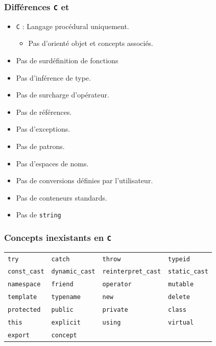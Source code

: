 \begin{frame}
\frametitle{Différences \texttt{C} et \cpp}
\begin{itemize}[<+->]
\item \texttt{C} : Langage procédural uniquement.
	\begin{itemize}
	\item Pas d'orienté objet et concepts associés.
	\end{itemize}
\item Pas de surdéfinition de fonctions
\item Pas d'inférence de type.
\item Pas de surcharge d'opérateur.
\item Pas de références.
\item Pas d'exceptions.
\item Pas de patrons.
\item Pas d'espaces de noms.
\item Pas de conversions définies par l'utilisateur.
\item Pas de conteneurs standards.
\item Pas de \texttt{string}
\end{itemize}
\end{frame}

\begin{frame}
\frametitle{Concepts inexistants en \texttt{C}}
\begin{center}
\begin{footnotesize}
\textcolor{blue!60}{
\begin{tabular}{llll}
\texttt{try} & \texttt{catch} & \texttt{throw} & \texttt{typeid}\\
\texttt{const\_cast} & \texttt{dynamic\_cast} & \texttt{reinterpret\_cast} & \texttt{static\_cast}\\
\texttt{namespace} & \texttt{friend} & \texttt{operator} & \texttt{mutable}\\
\texttt{template} &\texttt{typename} & \texttt{new} & \texttt{delete}\\
\texttt{protected} & \texttt{public} & \texttt{private} & \texttt{class}\\
\texttt{this} & \texttt{explicit} & \texttt{using} & \texttt{virtual}\\
\texttt{export} & \texttt{concept}\\
\end{tabular}}
\end{footnotesize}
\end{center}
\end{frame}

